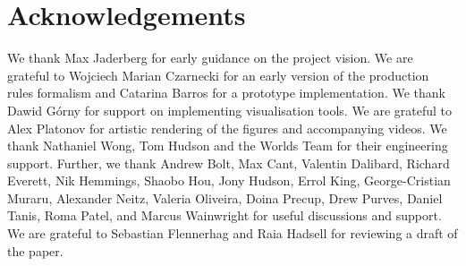 \section{Acknowledgements}

We thank Max Jaderberg for early guidance on the project vision. We are grateful to Wojciech Marian Czarnecki for an early version of the production rules formalism and Catarina Barros for a prototype implementation. We thank Dawid G\'orny for support on implementing visualisation tools. We are grateful to Alex Platonov for artistic rendering of the figures and accompanying videos. We thank Nathaniel Wong, Tom Hudson and the Worlds Team for their engineering support. Further, we thank Andrew Bolt, Max Cant, Valentin Dalibard, Richard Everett, Nik Hemmings, Shaobo Hou, Jony Hudson, Errol King, George-Cristian Muraru, Alexander Neitz, Valeria Oliveira, Doina Precup, Drew Purves, Daniel Tanis, Roma Patel, and Marcus Wainwright for useful discussions and support. We are grateful to Sebastian Flennerhag and Raia Hadsell for reviewing a draft of the paper.